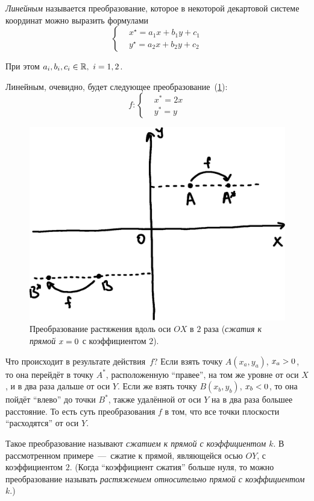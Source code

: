 \documentclass[a4paper,12pt]{article}
\begin{document}
  \begin{definition}
    \emph{Линейным} называется преобразование, которое в некоторой декартовой системе координат можно выразить формулами
    \begin{equation}
      \label{eq:linear}
      \left\{
        \begin{aligned}
          &x^\star = a_1 x + b_1 y + c_1\\
          &y^\star = a_2 x + b_2 y + c_2
        \end{aligned}
      \right.
    \end{equation}
    
    При этом $a_i, b_i, c_i \hm\in \RR,\ i = 1, 2$.
  \end{definition}
  
  \begin{example}
    Линейным, очевидно, будет следующее преобразование~(\ref{fig:linear-example}):
    \begin{equation}\label{eq:linear-example}
      f\colon \left\{
        \begin{aligned}
          &x^* = 2x\\
          &y^* = y
        \end{aligned}
      \right.
    \end{equation}
    
    \begin{figure}
      \centering
      
      \includegraphics[width=0.6\columnwidth]{linear-example}
      
      \caption{Преобразование растяжения вдоль оси $OX$ в $2$ раза (\emph{сжатия к прямой} $x \hm= 0$ с коэффициентом $2$).}
      \label{fig:linear-example}
    \end{figure}
    
    Что происходит в результате действия~$f$?
    Если взять точку $A(x_a, y_a)$, $x_a \hm> 0$, то она перейдёт в точку $A^*$, расположенную ``правее'', на том же уровне от оси $X$, и в два раза дальше от оси $Y$.
    Если же взять точку $B(x_b, y_b)$, $x_b \hm< 0$, то она пойдёт ``влево'' до точки $B^*$, также удалённой от оси $Y$ на в два раза большее расстояние.
    То есть суть преобразования $f$ в том, что все точки плоскости ``расходятся'' от оси $Y$.
    
    Такое преобразование называют \emph{сжатием к прямой с коэффициентом $k$}.
    В рассмотренном примере~---~сжатие к прямой, являющейся осью $OY$, с коэффициентом $2$.
    (Когда ``коэффициент сжатия'' больше нуля, то можно преобразование называть \emph{растяжением относительно прямой с коэффициентом $k$}.)
  \end{example}
  
\end{document}
